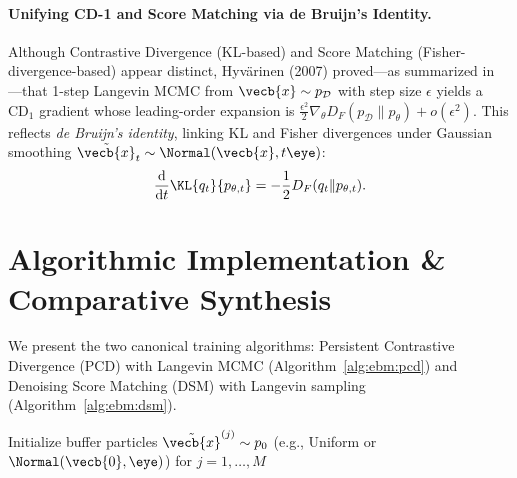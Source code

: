 \documentclass[../../../../master.tex]{subfiles}
\begin{document}
\paragraph{Unifying CD-1 and Score Matching via de Bruijn's Identity.}
Although Contrastive Divergence (KL-based) and Score Matching (Fisher-divergence-based) appear distinct, Hyv\"arinen (2007) proved—as summarized in —that 1-step Langevin MCMC from $\vecb{x} \sim p_{\mathcal{D}}$ with step size $\epsilon$ yields a $\mathrm{CD}_1$ gradient whose leading-order expansion is $\frac{\epsilon^2}{2}\nabla_\theta D_F(p_{\mathcal{D}} \| p_\theta) + o(\epsilon^2)$. This reflects \emph{de Bruijn's identity}, linking KL and Fisher divergences under Gaussian smoothing $\tilde{\vecb{x}}_t \sim \Normal(\vecb{x}, t\eye)$:
\begin{equation}
  \frac{\mathrm{d}}{\mathrm{d}t} \KL{q_t}{p_{\theta,t}} = -\frac{1}{2} D_F(q_t \| p_{\theta,t}).
  \label{eq:ebm:debruijn}
\end{equation}

\section{Algorithmic Implementation \& Comparative Synthesis}
\label{sec:ebm:algorithms}

We present the two canonical training algorithms: Persistent Contrastive Divergence (PCD) with Langevin MCMC (Algorithm~\ref{alg:ebm:pcd}) and Denoising Score Matching (DSM) with Langevin sampling (Algorithm~\ref{alg:ebm:dsm}).

\begin{algorithm}[htbp]
  \caption{Persistent Contrastive Divergence (PCD / SML) with Langevin MCMC}
  \label{alg:ebm:pcd}
  Initialize buffer particles $\tilde{\vecb{x}}^{(j)} \sim p_0$ (e.g., Uniform or $\Normal(\vecb{0},\eye)$) for $j=1,\dots,M$\;
\end{algorithm}
\end{document}
